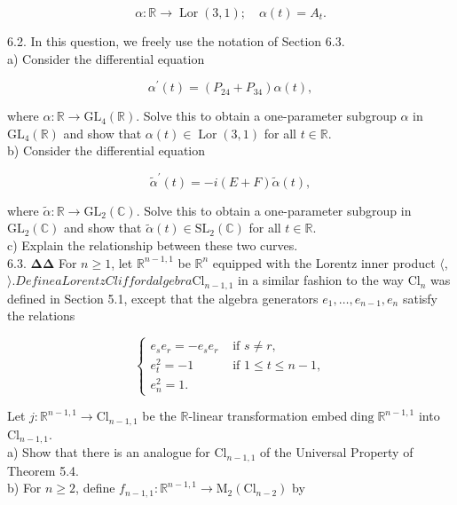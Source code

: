 \documentclass[10pt, letterpaper]{article}
\begin{document}
$$
\alpha: \mathbb{R} \longrightarrow \operatorname{Lor}(3,1) ; \quad \alpha(t)=A_{t} .
$$

6.2. In this question, we freely use the notation of Section 6.3.\\
a) Consider the differential equation

$$
\alpha^{\prime}(t)=\left(P_{24}+P_{34}\right) \alpha(t),
$$

where $\alpha: \mathbb{R} \longrightarrow \mathrm{GL}_{4}(\mathbb{R})$. Solve this to obtain a one-parameter subgroup $\alpha$ in $\mathrm{GL}_{4}(\mathbb{R})$ and show that $\alpha(t) \in \operatorname{Lor}(3,1)$ for all $t \in \mathbb{R}$.\\
b) Consider the differential equation

$$
\widetilde{\alpha}^{\prime}(t)=-i(E+F) \widetilde{\alpha}(t),
$$

where $\widetilde{\alpha}: \mathbb{R} \longrightarrow \mathrm{GL}_{2}(\mathbb{C})$. Solve this to obtain a one-parameter subgroup in $\mathrm{GL}_{2}(\mathbb{C})$ and show that $\widetilde{\alpha}(t) \in \mathrm{SL}_{2}(\mathbb{C})$ for all $t \in \mathbb{R}$.\\
c) Explain the relationship between these two curves.\\
6.3. $\boldsymbol{\Delta} \boldsymbol{\Delta}$ For $n \geqslant 1$, let $\mathbb{R}^{n-1,1}$ be $\mathbb{R}^{n}$ equipped with the Lorentz inner product $\langle$,$\rangle . Define a Lorentz Clifford algebra \mathrm{Cl}_{n-1,1}$ in a similar fashion to the way $\mathrm{Cl}_{n}$ was defined in Section 5.1, except that the algebra generators $e_{1}, \ldots, e_{n-1}, e_{n}$ satisfy the relations

$$
\begin{cases}e_{s} e_{r}=-e_{s} e_{r} & \text { if } s \neq r, \\ e_{t}^{2}=-1 & \text { if } 1 \leqslant t \leqslant n-1, \\ e_{n}^{2}=1 . & \end{cases}
$$

Let $j: \mathbb{R}^{n-1,1} \longrightarrow \mathrm{Cl}_{n-1,1}$ be the $\mathbb{R}$-linear transformation embed$\operatorname{ding} \mathbb{R}^{n-1,1}$ into $\mathrm{Cl}_{n-1,1}$.\\
a) Show that there is an analogue for $\mathrm{Cl}_{n-1,1}$ of the Universal Property of Theorem 5.4.\\
b) For $n \geqslant 2$, define $f_{n-1,1}: \mathbb{R}^{n-1,1} \longrightarrow \mathrm{M}_{2}\left(\mathrm{Cl}_{n-2}\right)$ by
\end{document}
